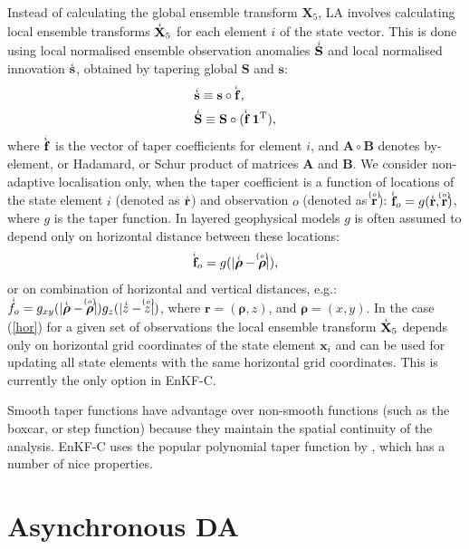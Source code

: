 \documentclass[11pt]{report}
\newcommand{\mb} {\mathbf}
\newcommand{\ms} {\boldsymbol}
\newcommand{\T}{^{\tiny \mathrm T}}
\newcommand{\ac}{\accentset}
\begin{document}
Instead of calculating the global ensemble transform $\mb X_5$, LA involves calculating local ensemble transforms $\ac{i}{\mb X}_5$ for each element $i$ of the state vector.
This is done using local normalised ensemble observation anomalies $\ac{i}{\mb S}$ and local normalised innovation $\ac{i}{\mb s}$, obtained by tapering global $\mb S$ and $\mb s$:
\begin{subequations}
  \begin{align}
    &\ac{i}{\mb s} \equiv \mb s \circ \ac{i}{\mb f},\\
    &\ac{i}{\mb S} \equiv \mb S \circ (\ac{i}{\mb f} \, \mb 1\T),
  \end{align}
\end{subequations}
where $\ac{i}{\mb f}$ is the vector of taper coefficients for element $i$, and $\mb A \circ \mb B$ denotes by-element, or Hadamard, or Schur product of matrices $\mb A$ and $\mb B$.
We consider non-adaptive localisation only, when the taper coefficient is a function of locations of the state element $i$ (denoted as $\ac{i}{\mb r}$) and observation $o$ (denoted as $\ac{\{o\}}{\mb r}$): $\ac{i}{\mb f}_o = g(\ac{i}{\mb r}, \ac{\{o\}}{\mb r})$, where $g$ is the taper function.
In layered geophysical models $g$ is often assumed to depend only on horizontal distance between these locations: 
\begin{align}
  \label{hor}
  \ac{i}{\mb f}_o = g(|\ac{i}{\ms \rho} - \ac{\{o\}}{\ms \rho}|),
\end{align}
or on combination of horizontal and vertical distances, e.g.: $\ac{i}f_o = g_{xy}(|\ac{i}{\ms \rho} - \ac{\{o\}}{\ms \rho}|)g_z(|\ac{i}z - \ac{\{o\}}z|)$, where $\mb r = (\ms \rho, z)$, and $\ms \rho = (x, y)$.
In the case (\ref{hor}) for a given set of observations the local ensemble transform $\ac{i}{\mb X}_5$ depends only on horizontal grid coordinates of the state element $\mb x_i$ and can be used for updating all state elements with the same horizontal grid coordinates.
This is currently the only option in EnKF-C.

Smooth taper functions have advantage over non-smooth functions (such as the boxcar, or step function) because they maintain the spatial continuity of the analysis.
EnKF-C uses the popular polynomial taper function by \citet{gas99a}, which has a number of nice properties.

\section{Asynchronous DA}
\end{document}
